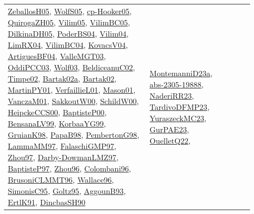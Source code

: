 {\begin{longtable}{lp{3cm}>{\raggedright}p{6cm}>{\raggedright}p{6cm}p{8cm}}
\href{articles/ZeballosH05.pdf}{ZeballosH05}\cite{ZeballosH05}, \href{papers/WolfS05.pdf}{WolfS05}\cite{WolfS05}, \href{papers/cp-Hooker05.pdf}{cp-Hooker05}\cite{cp-Hooker05}, \href{papers/QuirogaZH05.pdf}{QuirogaZH05}\cite{QuirogaZH05}, \href{papers/Vilim05.pdf}{Vilim05}\cite{Vilim05}, \href{articles/VilimBC05.pdf}{VilimBC05}\cite{VilimBC05}, \href{papers/DilkinaDH05.pdf}{DilkinaDH05}\cite{DilkinaDH05}, \href{articles/PoderBS04.pdf}{PoderBS04}\cite{PoderBS04}, \href{papers/Vilim04.pdf}{Vilim04}\cite{Vilim04}, \href{papers/LimRX04.pdf}{LimRX04}\cite{LimRX04}, \href{papers/VilimBC04.pdf}{VilimBC04}\cite{VilimBC04}, \href{papers/KovacsV04.pdf}{KovacsV04}\cite{KovacsV04}, \href{papers/ArtiguesBF04.pdf}{ArtiguesBF04}\cite{ArtiguesBF04}, \href{papers/ValleMGT03.pdf}{ValleMGT03}\cite{ValleMGT03}, \href{papers/OddiPCC03.pdf}{OddiPCC03}\cite{OddiPCC03}, \href{papers/Wolf03.pdf}{Wolf03}\cite{Wolf03}, \href{papers/BeldiceanuC02.pdf}{BeldiceanuC02}\cite{BeldiceanuC02}, \href{articles/Timpe02.pdf}{Timpe02}\cite{Timpe02}, \href{papers/Bartak02a.pdf}{Bartak02a}\cite{Bartak02a}, \href{papers/Bartak02.pdf}{Bartak02}\cite{Bartak02}, \href{articles/MartinPY01.pdf}{MartinPY01}\cite{MartinPY01}, \href{papers/VerfaillieL01.pdf}{VerfaillieL01}\cite{VerfaillieL01}, \href{articles/Mason01.pdf}{Mason01}\cite{Mason01}, \href{papers/VanczaM01.pdf}{VanczaM01}\cite{VanczaM01}, \href{articles/SakkoutW00.pdf}{SakkoutW00}\cite{SakkoutW00}, \href{articles/SchildW00.pdf}{SchildW00}\cite{SchildW00}, \href{articles/HeipckeCCS00.pdf}{HeipckeCCS00}\cite{HeipckeCCS00}, \href{articles/BaptisteP00.pdf}{BaptisteP00}\cite{BaptisteP00}, \href{articles/BensanaLV99.pdf}{BensanaLV99}\cite{BensanaLV99}, \href{papers/KorbaaYG99.pdf}{KorbaaYG99}\cite{KorbaaYG99}, \href{papers/GruianK98.pdf}{GruianK98}\cite{GruianK98}, \href{articles/PapaB98.pdf}{PapaB98}\cite{PapaB98}, \href{papers/PembertonG98.pdf}{PembertonG98}\cite{PembertonG98}, \href{articles/LammaMM97.pdf}{LammaMM97}\cite{LammaMM97}, \href{articles/FalaschiGMP97.pdf}{FalaschiGMP97}\cite{FalaschiGMP97}, \href{articles/Zhou97.pdf}{Zhou97}\cite{Zhou97}, \href{articles/Darby-DowmanLMZ97.pdf}{Darby-DowmanLMZ97}\cite{Darby-DowmanLMZ97}, \href{papers/BaptisteP97.pdf}{BaptisteP97}\cite{BaptisteP97}, \href{papers/Zhou96.pdf}{Zhou96}\cite{Zhou96}, \href{papers/Colombani96.pdf}{Colombani96}\cite{Colombani96}, \href{papers/BrusoniCLMMT96.pdf}{BrusoniCLMMT96}\cite{BrusoniCLMMT96}, \href{articles/Wallace96.pdf}{Wallace96}\cite{Wallace96}, \href{papers/SimonisC95.pdf}{SimonisC95}\cite{SimonisC95}, \href{papers/Goltz95.pdf}{Goltz95}\cite{Goltz95}, \href{articles/AggounB93.pdf}{AggounB93}\cite{AggounB93}, \href{papers/ErtlK91.pdf}{ErtlK91}\cite{ErtlK91}, \href{articles/DincbasSH90.pdf}{DincbasSH90}\cite{DincbasSH90} & \href{articles/MontemanniD23a.pdf}{MontemanniD23a}\cite{MontemanniD23a}, \href{articles/abs-2305-19888.pdf}{abs-2305-19888}\cite{abs-2305-19888}, \href{articles/NaderiRR23.pdf}{NaderiRR23}\cite{NaderiRR23}, \href{papers/TardivoDFMP23.pdf}{TardivoDFMP23}\cite{TardivoDFMP23}, \href{papers/YuraszeckMC23.pdf}{YuraszeckMC23}\cite{YuraszeckMC23}, \href{articles/GurPAE23.pdf}{GurPAE23}\cite{GurPAE23}, \href{papers/OuelletQ22.pdf}{OuelletQ22}\cite{OuelletQ22}, 
\end{longtable}}
